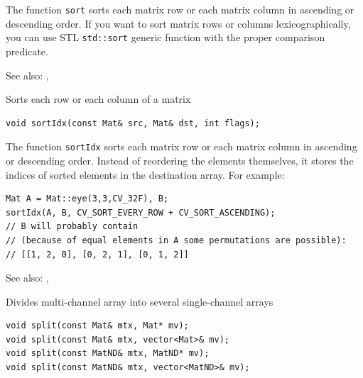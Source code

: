 The function \texttt{sort} sorts each matrix row or each matrix column in ascending or descending order. If you want to sort matrix rows or columns lexicographically, you can use STL \texttt{std::sort} generic function with the proper comparison predicate.

See also: , 

\label{sortIdx}
Sorts each row or each column of a matrix

\begin{lstlisting}
void sortIdx(const Mat& src, Mat& dst, int flags);
\end{lstlisting}
\begin{description}
\end{description}

The function \texttt{sortIdx} sorts each matrix row or each matrix column in ascending or descending order. Instead of reordering the elements themselves, it stores the indices of sorted elements in the destination array. For example:

\begin{lstlisting}
Mat A = Mat::eye(3,3,CV_32F), B;
sortIdx(A, B, CV_SORT_EVERY_ROW + CV_SORT_ASCENDING);
// B will probably contain
// (because of equal elements in A some permutations are possible):
// [[1, 2, 0], [0, 2, 1], [0, 1, 2]]
\end{lstlisting}

See also: , 

\label{split}
Divides multi-channel array into several single-channel arrays

\begin{lstlisting}
void split(const Mat& mtx, Mat* mv);
void split(const Mat& mtx, vector<Mat>& mv);
void split(const MatND& mtx, MatND* mv);
void split(const MatND& mtx, vector<MatND>& mv);
\end{lstlisting}
\begin{description}
\end{description}

